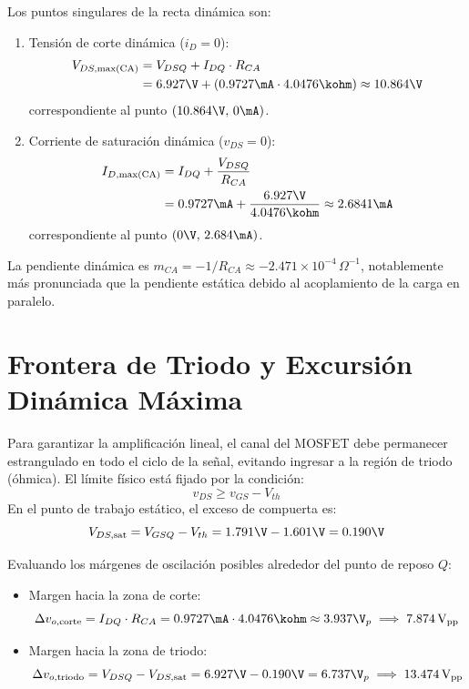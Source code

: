Los puntos singulares de la recta dinámica son:
\begin{enumerate}
  \item Tensión de corte dinámica ($i_D = 0$):
    \begin{equation}
      \begin{aligned}
        V_{DS,\max(\mathrm{CA})} &= V_{DSQ} + I_{DQ} \cdot R_{CA} \\
        &= 6.927\V + (0.9727\mA \cdot 4.0476\kohm) \approx 10.864\V
      \end{aligned}
    \end{equation}
    correspondiente al punto $(10.864\V,\, 0\mA)$.
  \item Corriente de saturación dinámica ($v_{DS} = 0$):
    \begin{equation}
      \begin{aligned}
        I_{D,\max(\mathrm{CA})} &= I_{DQ} + \frac{V_{DSQ}}{R_{CA}} \\
        &= 0.9727\mA + \frac{6.927\V}{4.0476\kohm} \approx 2.6841\mA
      \end{aligned}
    \end{equation}
    correspondiente al punto $(0\V,\, 2.684\mA)$.
\end{enumerate}

La pendiente dinámica es $m_{CA} = -1/R_{CA} \approx -2.471 \times 10^{-4}\,\Omega^{-1}$, notablemente más pronunciada
que la pendiente estática debido al acoplamiento de la carga en paralelo.

\section{Frontera de Triodo y Excursión Dinámica Máxima}

Para garantizar la amplificación lineal, el canal del MOSFET debe permanecer estrangulado en todo el ciclo de la señal,
evitando ingresar a la región de triodo (óhmica). El límite físico está fijado por la condición:
\begin{equation}
  v_{DS} \ge v_{GS} - V_{th}
\end{equation}
En el punto de trabajo estático, el exceso de compuerta es:
\begin{equation}
  V_{DS,\mathrm{sat}} = V_{GSQ} - V_{th} = 1.791\V - 1.601\V = 0.190\V
\end{equation}

Evaluando los márgenes de oscilación posibles alrededor del punto de reposo $Q$:
\begin{itemize}
  \item Margen hacia la zona de corte:
    \begin{equation}
      \Delta v_{o,\mathrm{corte}} = I_{DQ} \cdot R_{CA} = 0.9727\mA \cdot 4.0476\kohm \approx 3.937\V_p \implies 7.874\Vpp
    \end{equation}
  \item Margen hacia la zona de triodo:
    \begin{equation}
      \Delta v_{o,\mathrm{triodo}} = V_{DSQ} - V_{DS,\mathrm{sat}} = 6.927\V - 0.190\V = 6.737\V_p \implies 13.474\Vpp
    \end{equation}
\end{itemize}

